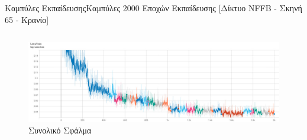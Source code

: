 \documentclass[10pt]{beamer}
\begin{document}
\begin{frame}{Καμπύλες Εκπαίδευσης}{Καμπύλες 2000 Εποχών Εκπαίδευσης [Δίκτυο NFFB - Σκηνή 65 - Κρανίο]}
\begin{columns}
    \begin{figure}
        \includegraphics[height=0.2\textheight]{images/chapter5_img/LossPlots/Tensorboard_Losses/NFFB/NFFB_loss_PLot65.jpg}
        \caption{Συνολικό Σφάλμα}
    \end{figure}
       

\end{columns}
\end{frame}
\end{document}

